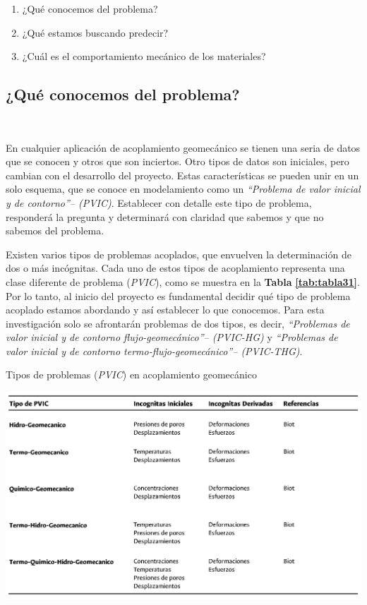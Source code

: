 \begin{enumerate}
    \item  ¿Qué conocemos del problema?
    \item  ¿Qué estamos buscando predecir?
    \item  ¿Cuál es el comportamiento mecánico de los materiales?
\end{enumerate}


\subsection{¿Qué conocemos del problema?}~\hypertarget{sec:sec311}{}
\label{sec:sec311}

En cualquier aplicación de acoplamiento geomecánico se tienen una seria de datos que se conocen y otros que son inciertos. Otro tipos de datos son iniciales, pero cambian con el desarrollo del proyecto. Estas características se pueden unir en un solo esquema, que se conoce en modelamiento como un \textit{“Problema de valor inicial y de contorno”– (PVIC)}. Establecer con detalle este tipo de problema, responderá la pregunta y determinará con claridad que sabemos y que no sabemos del problema.\bigskip 

Existen varios tipos de problemas acoplados, que envuelven la determinación de dos o más incógnitas. Cada uno de estos tipos de acoplamiento representa una clase diferente de problema (\textit{PVIC}), como se muestra en la \textbf{Tabla} \textbf{\ref{tab:tabla31}}. Por lo tanto, al inicio del proyecto es fundamental decidir qué tipo de problema acoplado estamos abordando y así establecer lo que conocemos. Para esta investigación solo se afrontarán problemas de dos tipos, es decir, \textit{“Problemas de valor inicial y de contorno flujo-geomecánico”– (PVIC-HG)}  y \textit{“Problemas de valor inicial y de contorno termo-flujo-geomecánico”– (PVIC-THG)}.\bigskip


\begin{table}[!ht]
\centering
\caption{Tipos de problemas (\textit{PVIC}) en acoplamiento geomecánico}
\vspace*{4mm}
\label{tab:tabla31}
\includegraphics[width=1.0\textwidth]{Tablas/Kap_03/Tipos_PVIC.png}
\end{table}

